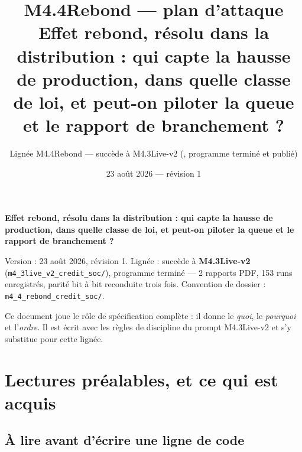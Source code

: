 \documentclass[11pt,a4paper]{article}
\title{M4.4Rebond --- plan d'attaque\\
\large Effet rebond, résolu dans la distribution : qui capte la hausse de
production, dans quelle classe de loi, et peut-on piloter la queue et le
rapport de branchement ?}
\author{Lignée M4.4Rebond --- succède à M4.3Live-v2
(\code{m4\_3live\_v2\_credit\_soc}, programme terminé et publié)}
\date{23 août 2026 --- révision 1}
\newcommand{\code}[1]{\texttt{#1}}
\begin{document}
\maketitle
\tableofcontents
\bigskip

\textbf{Effet rebond, résolu dans la distribution : qui capte la hausse de production, dans quelle classe de loi, et peut-on piloter la queue et le rapport de branchement ?}

Version : 23 août 2026, révision 1. Lignée : succède à \textbf{M4.3Live-v2} (\code{m4\_3live\_v2\_credit\_soc/}), programme terminé --- 2 rapports PDF, 153 runs enregistrés, parité bit à bit reconduite trois fois. Convention de dossier : \code{m4\_4\_rebond\_credit\_soc/}.

Ce document joue le rôle de spécification complète : il donne le \emph{quoi}, le \emph{pourquoi} et l'\emph{ordre}. Il est écrit avec les règles de discipline du prompt M4.3Live-v2 et s'y substitue pour cette lignée.

\bigskip

\setcounter{section}{-1}
\section{Lectures préalables, et ce qui est acquis}

\subsection*{À lire avant d'écrire une ligne de code}
\end{document}
